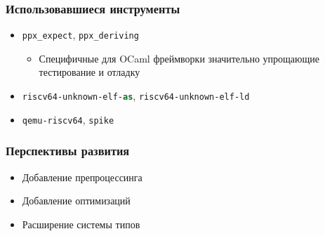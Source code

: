 \documentclass{beamer}
\begin{document}
\begin{frame}
	\frametitle{Использовавшиеся инструменты}
		\begin{itemize}
			\item \lstinline[language=ML]|ppx_expect|,  \lstinline[language=ML]|ppx_deriving|
			\begin{itemize}
				\item Специфичные для OCaml фреймворки значительно упрощающие тестирование и отладку
			\end{itemize}
			
			\item \lstinline[language=ML]|riscv64-unknown-elf-as|,  \lstinline[language=ML]|riscv64-unknown-elf-ld|
			\item \lstinline[language=ML]|qemu-riscv64|, \lstinline[language=ML]|spike|
		\end{itemize}
\end{frame}
	\begin{frame}
	\frametitle{Перспективы развития}
	\begin{itemize}
		\item Добавление препроцессинга
		\item Добавление оптимизаций
		\item Расширение системы типов
	\end{itemize}
\end{frame}
\end{document}
